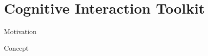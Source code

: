 \section{Cognitive Interaction Toolkit}

\begin{frame}[fragile]{Motivation}
	

\end{frame}

\begin{frame}[fragile]{Concept}
	
	
\end{frame}